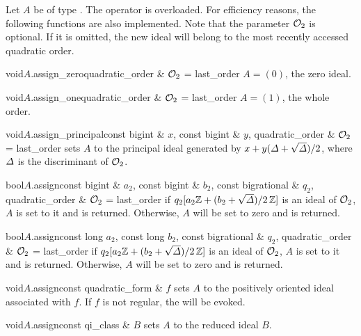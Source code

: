 
\ASGN

Let $A$ be of type .  The operator \code{=} is overloaded.  For efficiency
reasons, the following functions are also implemented.  Note that the parameter $\mathcal{O}_2$ is
optional.  If it is omitted, the new ideal will belong to the most recently accessed quadratic
order.

\begin{fcode}{void}{$A$.assign_zero}{quadratic_order & $\mathcal{O}_2$ = last_order}
  $A = (0)$, the zero ideal.
\end{fcode}

\begin{fcode}{void}{$A$.assign_one}{quadratic_order & $\mathcal{O}_2$ = last_order}
  $A = (1)$, the whole order.
\end{fcode}

\begin{fcode}{void}{$A$.assign_principal}{const bigint & $x$, const bigint & $y$,
    quadratic_order & $\mathcal{O}_2$ = last_order}%
  sets $A$ to the principal ideal generated by $x + y (\varDelta + \sqrt{\varDelta}) / 2$, where $\varDelta$ is the
  discriminant of $\mathcal{O}_2$.
\end{fcode}

\begin{fcode}{bool}{$A$.assign}{const bigint & $a_2$, const bigint & $b_2$,
    const bigrational & $q_2$, quadratic_order & $\mathcal{O}_2$ = last_order}%
  if $q_2 [a_2\mathbb{Z} + (b_2 + \sqrt{\varDelta})/2\, \mathbb{Z} ]$ is an ideal of $\mathcal{O}_2$, $A$ is set to it
  and \TRUE is returned.  Otherwise, $A$ will be set to zero and \FALSE is returned.
\end{fcode}

\begin{fcode}{bool}{$A$.assign}{const long $a_2$, const long $b_2$, const bigrational & $q_2$,
    quadratic_order & $\mathcal{O}_2$ = last_order}%
  if $q_2 [a_2\mathbb{Z} + (b_2 + \sqrt{\varDelta})/2\, \mathbb{Z} ]$ is an ideal of $\mathcal{O}_2$, $A$ is set to it
  and \TRUE is returned.  Otherwise, $A$ will be set to zero and \FALSE is returned.
\end{fcode}

\begin{fcode}{void}{$A$.assign}{const quadratic_form & $f$}
  sets $A$ to the positively oriented ideal associated with $f$.  If $f$ is not regular, the
  \LEH will be evoked.
\end{fcode}

\begin{fcode}{void}{$A$.assign}{const qi_class & $B$}
  sets $A$ to the reduced ideal $B$.
\end{fcode}

